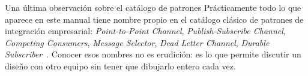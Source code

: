 \documentclass[11pt,a4paper]{book}
\begin{document}
\begin{cajaNota}{Una última observación sobre el catálogo de patrones}
	Prácticamente todo lo que aparece en este manual tiene nombre propio en el catálogo clásico de patrones de integración empresarial: \emph{Point-to-Point Channel}, \emph{Publish-Subscribe Channel}, \emph{Competing Consumers}, \emph{Message Selector}, \emph{Dead Letter Channel}, \emph{Durable Subscriber}~\cite{hohpe2003eip}.
	Conocer esos nombres no es erudición: es lo que permite discutir un diseño con otro equipo sin tener que dibujarlo entero cada vez.
\end{cajaNota}

\backmatter

\printbibliography[title={Bibliografía},heading=bibintoc]
\end{document}
